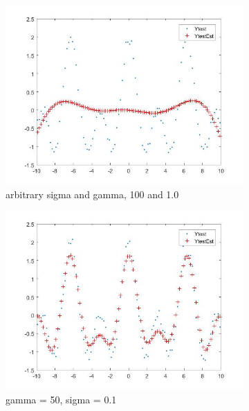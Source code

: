 \documentclass[11pt,oneside,a4paper]{article}
\begin{document}
\begin{figure}[H]
	\begin{subfigure}[b]{0.4\textwidth}
		\includegraphics[width=\textwidth]{../Figures/test_sig_gam_arb}
		\caption{arbitrary sigma and gamma, 100 and 1.0}
	\end{subfigure}
	\begin{subfigure}[b]{0.4\textwidth}
		\includegraphics[width=\textwidth]{../Figures/sig_gama_50_1}
		\caption{gamma = 50, sigma = 0.1}
	\end{subfigure}
	\begin{subfigure}[b]{0.4\textwidth}

\end{subfigure}
\end{figure}
\end{document}
